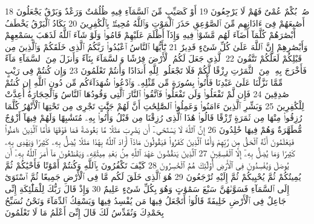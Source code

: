{\tiny\colorbox{cl_aya}{18}} صُمٌّۢ بُكْمٌ عُمْىٌ فَهُمْ لَا يَرْجِعُونَ
{\tiny\colorbox{cl_aya}{19}} أَوْ كَصَيِّبٍ مِّنَ ٱلسَّمَآءِ فِيهِ ظُلُمَٰتٌ وَرَعْدٌ وَبَرْقٌ يَجْعَلُونَ أَصَٰبِعَهُمْ فِىٓ ءَاذَانِهِم مِّنَ ٱلصَّوَٰعِقِ حَذَرَ ٱلْمَوْتِ وَٱللَّهُ مُحِيطٌۢ بِٱلْكَٰفِرِينَ
{\tiny\colorbox{cl_aya}{20}} يَكَادُ ٱلْبَرْقُ يَخْطَفُ أَبْصَٰرَهُمْ كُلَّمَآ أَضَآءَ لَهُم مَّشَوْا۟ فِيهِ وَإِذَآ أَظْلَمَ عَلَيْهِمْ قَامُوا۟ وَلَوْ شَآءَ ٱللَّهُ لَذَهَبَ بِسَمْعِهِمْ وَأَبْصَٰرِهِمْ إِنَّ ٱللَّهَ عَلَىٰ كُلِّ شَىْءٍ قَدِيرٌ
{\tiny\colorbox{cl_aya}{21}} يَٰٓأَيُّهَا ٱلنَّاسُ ٱعْبُدُوا۟ رَبَّكُمُ ٱلَّذِى خَلَقَكُمْ وَٱلَّذِينَ مِن قَبْلِكُمْ لَعَلَّكُمْ تَتَّقُونَ
{\tiny\colorbox{cl_aya}{22}} ٱلَّذِى جَعَلَ لَكُمُ ٱلْأَرْضَ فِرَٰشًا وَٱلسَّمَآءَ بِنَآءً وَأَنزَلَ مِنَ ٱلسَّمَآءِ مَآءً فَأَخْرَجَ بِهِۦ مِنَ ٱلثَّمَرَٰتِ رِزْقًا لَّكُمْ فَلَا تَجْعَلُوا۟ لِلَّهِ أَندَادًا وَأَنتُمْ تَعْلَمُونَ
{\tiny\colorbox{cl_aya}{23}} وَإِن كُنتُمْ فِى رَيْبٍ مِّمَّا نَزَّلْنَا عَلَىٰ عَبْدِنَا فَأْتُوا۟ بِسُورَةٍ مِّن مِّثْلِهِۦ وَٱدْعُوا۟ شُهَدَآءَكُم مِّن دُونِ ٱللَّهِ إِن كُنتُمْ صَٰدِقِينَ
{\tiny\colorbox{cl_aya}{24}} فَإِن لَّمْ تَفْعَلُوا۟ وَلَن تَفْعَلُوا۟ فَٱتَّقُوا۟ ٱلنَّارَ ٱلَّتِى وَقُودُهَا ٱلنَّاسُ وَٱلْحِجَارَةُ أُعِدَّتْ لِلْكَٰفِرِينَ
{\tiny\colorbox{cl_aya}{25}} وَبَشِّرِ ٱلَّذِينَ ءَامَنُوا۟ وَعَمِلُوا۟ ٱلصَّٰلِحَٰتِ أَنَّ لَهُمْ جَنَّٰتٍ تَجْرِى مِن تَحْتِهَا ٱلْأَنْهَٰرُ كُلَّمَا رُزِقُوا۟ مِنْهَا مِن ثَمَرَةٍ رِّزْقًا قَالُوا۟ هَٰذَا ٱلَّذِى رُزِقْنَا مِن قَبْلُ وَأُتُوا۟ بِهِۦ مُتَشَٰبِهًا وَلَهُمْ فِيهَآ أَزْوَٰجٌ مُّطَهَّرَةٌ وَهُمْ فِيهَا خَٰلِدُونَ
{\tiny\colorbox{cl_aya}{26}} إِنَّ ٱللَّهَ لَا يَسْتَحْىِۦٓ أَن يَضْرِبَ مَثَلًا مَّا بَعُوضَةً فَمَا فَوْقَهَا فَأَمَّا ٱلَّذِينَ ءَامَنُوا۟ فَيَعْلَمُونَ أَنَّهُ ٱلْحَقُّ مِن رَّبِّهِمْ وَأَمَّا ٱلَّذِينَ كَفَرُوا۟ فَيَقُولُونَ مَاذَآ أَرَادَ ٱللَّهُ بِهَٰذَا مَثَلًا يُضِلُّ بِهِۦ كَثِيرًا وَيَهْدِى بِهِۦ كَثِيرًا وَمَا يُضِلُّ بِهِۦٓ إِلَّا ٱلْفَٰسِقِينَ
{\tiny\colorbox{cl_aya}{27}} ٱلَّذِينَ يَنقُضُونَ عَهْدَ ٱللَّهِ مِنۢ بَعْدِ مِيثَٰقِهِۦ وَيَقْطَعُونَ مَآ أَمَرَ ٱللَّهُ بِهِۦٓ أَن يُوصَلَ وَيُفْسِدُونَ فِى ٱلْأَرْضِ أُو۟لَٰٓئِكَ هُمُ ٱلْخَٰسِرُونَ
{\tiny\colorbox{cl_aya}{28}} كَيْفَ تَكْفُرُونَ بِٱللَّهِ وَكُنتُمْ أَمْوَٰتًا فَأَحْيَٰكُمْ ثُمَّ يُمِيتُكُمْ ثُمَّ يُحْيِيكُمْ ثُمَّ إِلَيْهِ تُرْجَعُونَ
{\tiny\colorbox{cl_aya}{29}} هُوَ ٱلَّذِى خَلَقَ لَكُم مَّا فِى ٱلْأَرْضِ جَمِيعًا ثُمَّ ٱسْتَوَىٰٓ إِلَى ٱلسَّمَآءِ فَسَوَّىٰهُنَّ سَبْعَ سَمَٰوَٰتٍ وَهُوَ بِكُلِّ شَىْءٍ عَلِيمٌ
{\tiny\colorbox{cl_aya}{30}} وَإِذْ قَالَ رَبُّكَ لِلْمَلَٰٓئِكَةِ إِنِّى جَاعِلٌ فِى ٱلْأَرْضِ خَلِيفَةً قَالُوٓا۟ أَتَجْعَلُ فِيهَا مَن يُفْسِدُ فِيهَا وَيَسْفِكُ ٱلدِّمَآءَ وَنَحْنُ نُسَبِّحُ بِحَمْدِكَ وَنُقَدِّسُ لَكَ قَالَ إِنِّىٓ أَعْلَمُ مَا لَا تَعْلَمُونَ

